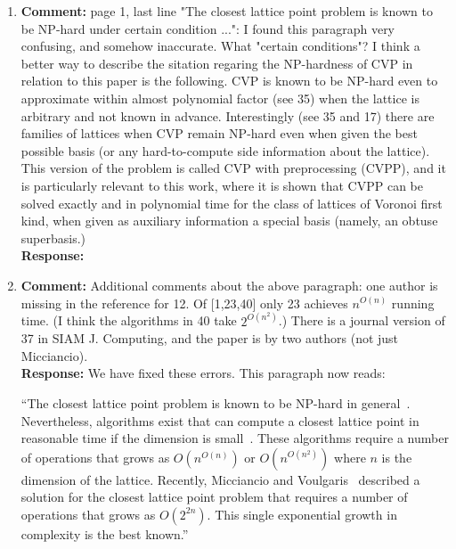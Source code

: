 \documentclass[a4paper,10pt]{article}
\begin{document}
\begin{enumerate}
\item\textbf{Comment:}  
page 1, last line "The closest lattice point problem is known to be NP-hard under certain condition ...": I found this paragraph very confusing, and somehow inaccurate. What "certain conditions"? I think a better way to describe the sitation regaring the NP-hardness of CVP in relation to this paper is the following. CVP is known to be NP-hard even to approximate within almost polynomial factor (see 35) when the lattice is arbitrary and not known in advance. Interestingly (see 35 and 17) there are families of lattices when CVP remain NP-hard even when given the best possible basis (or any hard-to-compute side information about the lattice). This version of the problem is called CVP with preprocessing (CVPP), and it is particularly relevant to this work, where it is shown that CVPP can be solved exactly and in polynomial time for the class of lattices of Voronoi first kind, when given as auxiliary information a special basis (namely, an obtuse superbasis.) 
\\\textbf{Response:}

\item\textbf{Comment:}  
Additional comments about the above paragraph: one author is missing in the reference for 12. Of [1,23,40] only 23 achieves $n^{O(n)}$ running time. (I think the algorithms in 40 take $2^{O(n^2)}$.) There is a journal version of 37 in SIAM J. Computing, and the paper is by two authors (not just Micciancio). 
\\\textbf{Response:}
We have fixed these errors.  This paragraph now reads:

``The closest lattice point problem is known to be NP-hard in general~\cite{micciancio_hardness_2001, Dinur2003_approximating_CVP_NP_hard,Regev_2004_inappox_lattice_with_preprocessing,feige_inapproximability_2004,Jalden2005_sphere_decoding_complexity}. Nevertheless, algorithms exist that can compute a closest lattice point in reasonable time if the dimension is small~\cite{Pohst_sphere_decoder_1981,Kannan1987_fast_general_np,Agrell2002}.  These algorithms require a number of operations that grows as $O(n^{O(n)})$ or $O(n^{O(n^2)})$ where $n$ is the dimension of the lattice.  Recently, Micciancio and Voulgaris~\cite{MicciancioVoulgaris_deterministic_jv_2013} described a solution for the closest lattice point problem that requires a number of operations that grows as $O(2^{2n})$.  This single exponential growth in complexity is the best known.''


\end{enumerate}
\end{document}
